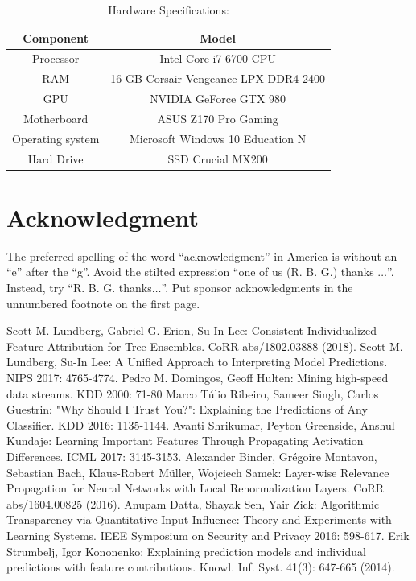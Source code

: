 \documentclass[conference]{IEEEtran}
\begin{document}
\begin{table}[htbp]
\caption{Hardware Specifications:}
\begin{center}
\begin{tabular}{|c|c|}
	\hline
	\textbf{Component} & \textbf{Model} \\
	\hline
	Processor & Intel Core i7-6700 CPU\\ \hline
	RAM & 16 GB Corsair Vengeance LPX DDR4-2400\\ \hline
	GPU & NVIDIA GeForce GTX 980 \\ \hline
	Motherboard & ASUS Z170 Pro Gaming \\ \hline
	Operating system & Microsoft Windows 10 Education N \\ \hline
	Hard Drive & SSD Crucial MX200 \\ \hline
\end{tabular}
\label{hardware}
\end{center}
\end{table}





\section*{Acknowledgment}

The preferred spelling of the word ``acknowledgment'' in America is without 
an ``e'' after the ``g''. Avoid the stilted expression ``one of us (R. B. 
G.) thanks $\ldots$''. Instead, try ``R. B. G. thanks$\ldots$''. Put sponsor 
acknowledgments in the unnumbered footnote on the first page.

\begin{thebibliography}{00}
 Scott M. Lundberg, Gabriel G. Erion, Su-In Lee:
Consistent Individualized Feature Attribution for Tree Ensembles. CoRR abs/1802.03888 (2018).
 Scott M. Lundberg, Su-In Lee: A Unified Approach to Interpreting Model Predictions. NIPS 2017: 4765-4774.
 Pedro M. Domingos, Geoff Hulten: Mining high-speed data streams. KDD 2000: 71-80
 Marco Túlio Ribeiro, Sameer Singh, Carlos Guestrin: "Why Should I Trust You?": Explaining the Predictions of Any Classifier. KDD 2016: 1135-1144.
 Avanti Shrikumar, Peyton Greenside, Anshul Kundaje: Learning Important Features Through Propagating Activation Differences. ICML 2017: 3145-3153.
 Alexander Binder, Grégoire Montavon, Sebastian Bach, Klaus-Robert Müller, Wojciech Samek: Layer-wise Relevance Propagation for Neural Networks with Local Renormalization Layers. CoRR abs/1604.00825 (2016).
Anupam Datta, Shayak Sen, Yair Zick: Algorithmic Transparency via Quantitative Input Influence: Theory and Experiments with Learning Systems. IEEE Symposium on Security and Privacy 2016: 598-617.
Erik Strumbelj, Igor Kononenko: Explaining prediction models and individual predictions with feature contributions. Knowl. Inf. Syst. 41(3): 647-665 (2014).

\end{thebibliography}
\end{document}
